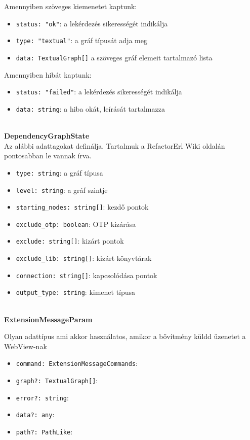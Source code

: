 \noindent Amennyiben szöveges kiemenetet kaptunk:
\begin{itemize}
    \item \lstinline{status: "ok"}: a lekérdezés sikerességét indikálja
    \item \lstinline{type: "textual"}: a gráf típusát adja meg
    \item \lstinline{data: TextualGraph[]} a szöveges gráf elemeit tartalmazó lista
\end{itemize}


\noindent Amennyiben hibát kaptunk:
\begin{itemize}
    \item \lstinline{status: "failed"}: a lekérdezés sikerességét indikálja
    \item \lstinline{data: string}: a hiba okát, leírását tartalmazza
\end{itemize}


\\
\vspace{14pt}
\textbf{DependencyGraphState} 
\\ Az alábbi adattagokat definálja. Tartalmuk a RefactorErl Wiki oldalán pontosabban le vannak írva. \cite{referlWikiDependency}
\begin{itemize}
    \item \lstinline{type: string}: a gráf típusa
    \item \lstinline{level: string}: a gráf szintje
    \item \lstinline{starting_nodes: string[]}: kezdő pontok
    \item \lstinline{exclude_otp: boolean}: OTP kizárása
    \item \lstinline{exclude: string[]}: kizárt pontok
    \item \lstinline{exclude_lib: string[]}: kizárt könyvtárak
    \item \lstinline{connection: string[]}: kapcsolódása pontok
    \item \lstinline{output_type: string}: kimenet típusa
    
\end{itemize}




\\
\vspace{14pt}
\textbf{ExtensionMessageParam}

Olyan adattípus ami akkor használatos, amikor a bővítmény küldd üzenetet a WebView-nak

\begin{itemize}
    \item \lstinline{command: ExtensionMessageCommands}:
    \item \lstinline{graph?: TextualGraph[]}:
    \item \lstinline{error?: string}:
    \item \lstinline{data?: any}:
    \item \lstinline{path?: PathLike}:
\end{itemize}





